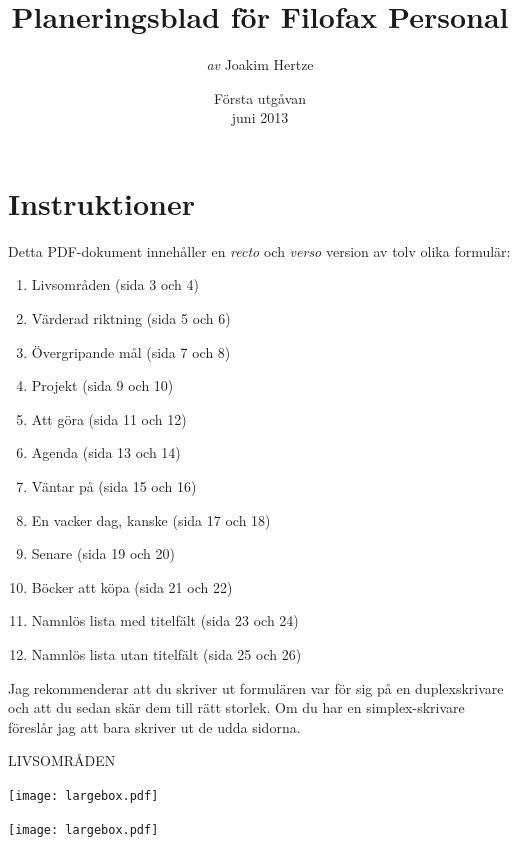 \documentclass[11pt,titlepage]{article}
\begin{document}
	
\title{Planeringsblad för Filofax Personal}
\author{\emph{av} Joakim Hertze}
\date{Första utgåvan \\ juni 2013}

\maketitle

\pagebreak

\section{Instruktioner}

Detta PDF-dokument innehåller en \emph{recto} och \emph{verso} version av tolv olika formulär:


\begin{enumerate}
	\item Livsområden (sida 3 och 4)
	\item Värderad riktning (sida 5 och 6)
	\item Övergripande mål (sida 7 och 8)
	\item Projekt (sida 9 och 10)
	\item Att göra (sida 11 och 12)
	\item Agenda (sida 13 och 14)
	\item Väntar på (sida 15 och 16)
	\item En vacker dag, kanske (sida 17 och 18)
	\item Senare (sida 19 och 20)
	\item Böcker att köpa (sida 21 och 22)
	\item Namnlös lista med titelfält (sida 23 och 24)
	\item Namnlös lista utan titelfält (sida 25 och 26)
\end{enumerate}

Jag rekommenderar att du skriver ut formulären var för sig på en duplexskrivare och att du sedan skär dem till rätt storlek. Om du har en simplex-skrivare föreslår jag att bara skriver ut de udda sidorna.

\pagebreak

\small %
\hfill LIVSOMRÅDEN

\vspace{6mm}

\noindent
\texttt{[image: largebox.pdf]}

\vspace{7,5mm}

\noindent
\texttt{[image: largebox.pdf]}
\end{document}
